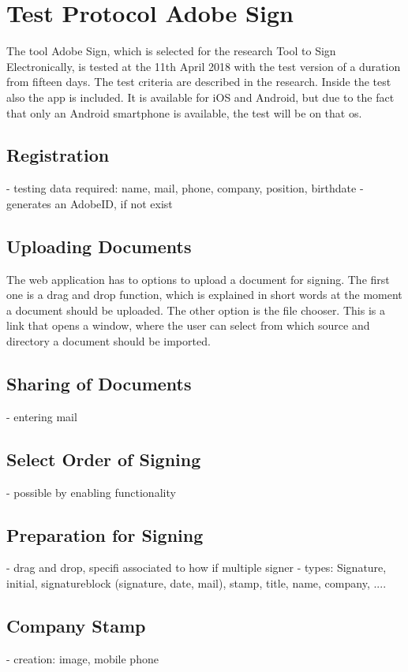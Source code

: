 \section{Test Protocol Adobe Sign}
The tool Adobe Sign, which is selected for the research Tool to Sign Electronically, is tested at the 11th April 2018 with the test version of a duration from fifteen days. The test criteria are described in the research. Inside the test also the \gls{app} is included. It is available for iOS and Android, but due to the fact that only an Android smartphone is available, the test will be on that \gls{os}.

\subsection{Registration}

- testing data required: name, mail, phone, company, position, birthdate
- generates an AdobeID, if not exist

\subsection{Uploading Documents}
The web application has to options to upload a document for signing. The first one is a drag and drop function, which is explained in short words at the moment a document should be uploaded. The other option is the file chooser. This is a link that opens a window, where the user can select from which source and directory a document should be imported.

\subsection{Sharing of Documents}

- entering mail

\subsection{Select Order of Signing}
- possible by enabling functionality

\subsection{Preparation for Signing}
- drag and drop, specifi associated to how if multiple signer
- types: Signature, initial, signatureblock (signature, date, mail), stamp, title, name, company, ....

\subsection{Company Stamp}
- creation: image, mobile phone


